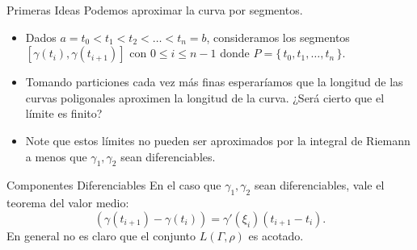 \documentclass[utf8]{beamer}
\theoremstyle{plain}
\theoremstyle{definition}
\theoremstyle{remark}
\numberwithin{equation}{section}
\newcommand{\Ga}{\Gamma}                %
\newcommand{\ga}{\gamma}                %
\newcommand{\set}[1]{\{\,#1\,\}}    %
\renewcommand{\leq}{\leqslant}          %
\renewcommand{\.}{\Cdot}                %
\begin{document}
\begin{frame}{Primeras Ideas}
  Podemos aproximar la curva por segmentos.
  \begin{itemize}
    \item Dados $a=t_0<t_1<t_2<\dots<t_n=b$, consideramos los segmentos $[\ga(t_i),\ga(t_{i+1})]$ con $0\leq i\leq n-1$ donde $P=\set{t_0,t_1,\dots,t_n}$.
    \item Tomando particiones cada vez más finas esperaríamos que la longitud de las curvas poligonales aproximen la longitud de la curva. ¿Será cierto que el límite es finito?
    \item Note que estos límites no pueden ser aproximados por la integral de Riemann a menos que $\ga_1,\ga_2$ sean diferenciables.
  \end{itemize}
\end{frame}

\begin{frame}{Componentes Diferenciables}
  En el caso que $\ga_1,\ga_2$ sean diferenciables, vale el teorema del valor medio:
  $$(\ga(t_{i+1})-\ga(t_i))=\ga'(\xi_i)(t_{i+1}-t_i).$$
  En general no es claro que el conjunto $L(\Ga,\rho)$ es acotado.
\end{frame}
\end{document}
